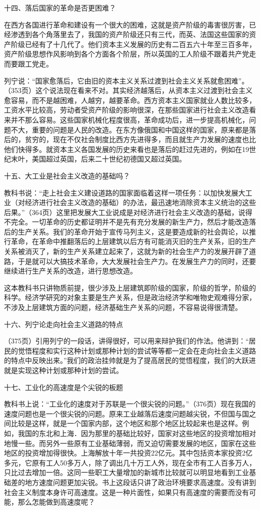 十四、落后国家的革命是否更困难？

在西方各国进行革命和建设有一个很大的困难，这就是资产阶级的毒害很厉害，已经渗透到各个角落里去了，我国的资产阶级还只有三代，而英、法国这些国家的资产阶级已经有了十几代了。他们资本主义发展的历史有二百五六十年至三百多年，资产阶级思想作风影响到各个方面各个阶层，所以英国的工人阶级不跟着共产党走而要跟工党走。

列宁说：“国家愈落后，它由旧的资本主义关系过渡到社会主义关系就愈困难”。（353页）这个说法现在看来不对。其实经济越落后，从资本主义过渡到社会主义愈容易，而不是越困难，人越穷，越要革命。西方资本主义国家就业人数比较多，工资水平比较高，劳动者受资产阶级的影响很深，在那些国家进行社会主义改造看来并不那么容易。这些国家机械化程度很高，革命成功后，进一步提高机械化，问题不大，重要的问题是人民的改造。在东方像俄国和中国这样的国家，原来都是落后的，贫穷的，现在不仅社会制度比西方先进得多，而且就生产力发展的速度也比他们快得多。就资本主义各国发展的历史来看也是落后的赶过先进的，例如在19世纪末叶，美国超过英国，后来二十世纪初德国又超过英国。

十五、大工业是社会主义改造的基础吗？

教科书说：“走上社会主义建设道路的国家面临着这样一项任务：以加快发展大工业（对经济进行社会主义改造的基础）的办法，最迅速地消除资本主义统治的这些后果。”（364页）这里把发展大工业说成是对经济进行社会主义改造的基础，说得不完全。一切革命的历史都证明并不是先有充分发展的新生产力，然后才能改造落后的生产关系。我们的革命开始于宣传马列主义，这是要造成新的社会舆论，以推行革命，在革命中推翻落后的上层建筑以后方有可能消灭旧的生产关系，旧的生产关系被消灭了，新的生产关系建立起来了，这就为新的社会生产力的发展开辟了道路，于是就可以大搞技术革命，大大发展社会生产力。在发展生产力的同时，还要继续进行生产关系的改造，进行思想改造。

这本教科书只讲物质前提，很少涉及上层建筑即阶级的国家，阶级的哲学，阶级的科学。经济学研究的对象主要是生产关系，但是政治经济学和唯物史观难得分家，不涉及上层建筑方面的问题，经济基础生产关系的问题，不容易说得很清楚。

十六、列宁论走向社会主义道路的特点

（375页）引用列宁的一段话，讲得很好，可以用来辩护我们的作法。他讲到：“居民的觉悟程度和实行这种计划或那种计划的尝试等等都一定会在走向社会主义道路的特点中反映出来。”我们的政治挂帅就是为了提高居民的觉悟程度，我们的大跃进就是实现这种计划或那种计划的尝试。

十七、工业化的高速度是个尖锐的板题

教科书上说：“工业化的速度对于苏联是一个很尖锐的问题。”（376页）现在我国的速度问题也是一个很尖锐的问题。原来工业越落后速度问题越尖锐，不但国与国之间比较是这样，就是一个国家内部，这个地区和那个地区比较起来也是这样。例如，我国的东北和上海．因为那里的基础比较好，国家对这些地区的投资增加相对地慢一些。而另外一些原有工业基础薄弱，而又迫切需要发展的地区，国家在这些地区的投资增加得很快。上海解放十年一共投资22亿元。其中包括资本家投资2亿多元，它原有工人50多万人，除了调出几十万工人外，现在全市有工人百多万人，只比过去增加一倍。这同一些职工大量增加的新城市比较就可以明显地看到工业基础差的地方速度问题更加尖锐。书上这段话只讲了政治环境要求高速度。没有讲到社会主义制度本身许可高速度。这是一种片面性，如果只有高速度的需要而没有可能，那么怎能做到高速度呢？

